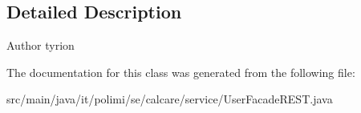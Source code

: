 \subsection{Detailed Description}
\begin{DoxyAuthor}{Author}
tyrion 
\end{DoxyAuthor}


The documentation for this class was generated from the following file\+:\begin{DoxyCompactItemize}
\item 
src/main/java/it/polimi/se/calcare/service/User\+Facade\+R\+E\+S\+T.\+java\end{DoxyCompactItemize}
